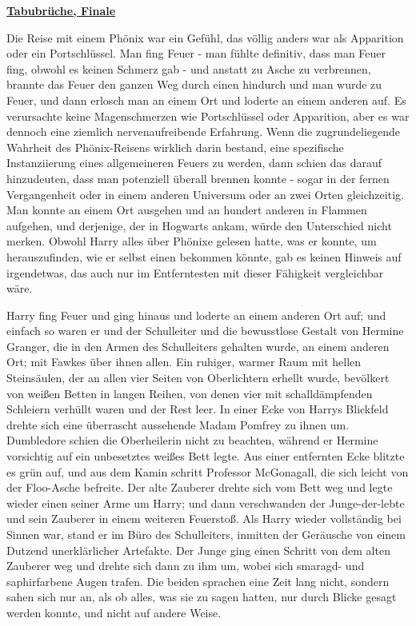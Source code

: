 

\hypertarget{tabubruxfcche-finale}{%

\textbf{\uline{Tabubrüche, Finale}}

\hfill\break Die Reise mit einem Phönix war ein Gefühl, das völlig anders war als Apparition oder ein Portschlüssel. Man fing Feuer - man fühlte definitiv, dass man Feuer fing, obwohl es keinen Schmerz gab - und anstatt zu Asche zu verbrennen, brannte das Feuer den ganzen Weg durch einen hindurch und man wurde zu Feuer, und dann erlosch man an einem Ort und loderte an einem anderen auf. Es verursachte keine Magenschmerzen wie Portschlüssel oder Apparition, aber es war dennoch eine ziemlich nervenaufreibende Erfahrung. Wenn die zugrundeliegende Wahrheit des Phönix-Reisens wirklich darin bestand, eine spezifische Instanziierung eines allgemeineren Feuers zu werden, dann schien das darauf hinzudeuten, dass man potenziell überall brennen konnte - sogar in der fernen Vergangenheit oder in einem anderen Universum oder an zwei Orten gleichzeitig. Man konnte an einem Ort ausgehen und an hundert anderen in Flammen aufgehen, und derjenige, der in Hogwarts ankam, würde den Unterschied nicht merken. Obwohl Harry alles über Phönixe gelesen hatte, was er konnte, um herauszufinden, wie er selbst einen bekommen könnte, gab es keinen Hinweis auf irgendetwas, das auch nur im Entferntesten mit dieser Fähigkeit vergleichbar wäre.

Harry fing Feuer und ging hinaus und loderte an einem anderen Ort auf; und einfach so waren er und der Schulleiter und die bewusstlose Gestalt von Hermine Granger, die in den Armen des Schulleiters gehalten wurde, an einem anderen Ort; mit Fawkes über ihnen allen. Ein ruhiger, warmer Raum mit hellen Steinsäulen, der an allen vier Seiten von Oberlichtern erhellt wurde, bevölkert von weißen Betten in langen Reihen, von denen vier mit schalldämpfenden Schleiern verhüllt waren und der Rest leer. In einer Ecke von Harrys Blickfeld drehte sich eine überrascht aussehende Madam Pomfrey zu ihnen um. Dumbledore schien die Oberheilerin nicht zu beachten, während er Hermine vorsichtig auf ein unbesetztes weißes Bett legte. Aus einer entfernten Ecke blitzte es grün auf, und aus dem Kamin schritt Professor McGonagall, die sich leicht von der Floo-Asche befreite. Der alte Zauberer drehte sich vom Bett weg und legte wieder einen seiner Arme um Harry; und dann verschwanden der Junge-der-lebte und sein Zauberer in einem weiteren Feuerstoß. Als Harry wieder vollständig bei Sinnen war, stand er im Büro des Schulleiters, inmitten der Geräusche von einem Dutzend unerklärlicher Artefakte. Der Junge ging einen Schritt von dem alten Zauberer weg und drehte sich dann zu ihm um, wobei sich smaragd- und saphirfarbene Augen trafen. Die beiden sprachen eine Zeit lang nicht, sondern sahen sich nur an, als ob alles, was sie zu sagen hatten, nur durch Blicke gesagt werden konnte, und nicht auf andere Weise.

}
